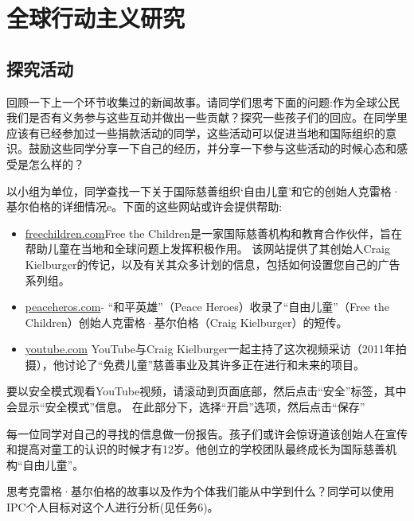\chapter{全球行动主义研究}

\section{探究活动}
    回顾一下上一个环节收集过的新闻故事。请同学们思考下面的问题:作为全球公民我们是否有义务参与这些互动并做出一些贡献？探究一些孩子们的回应。在同学里应该有已经参加过一些捐款活动的同学，这些活动可以促进当地和国际组织的意识。鼓励这些同学分享一下自己的经历，并分享一下参与这些活动的时候心态和感受是怎么样的？\par
    以小组为单位，同学查找一下关于国际慈善组织‘自由儿童’和它的创始人克雷格·基尔伯格的详细情况e。下面的这些网站或许会提供帮助:\par
    \begin{itemize}
      \item \href{http://www.freethechildren.com/about-us/our-story/}{freechildren.com}Free the Children是一家国际慈善机构和教育合作伙伴，旨在帮助儿童在当地和全球问题上发挥积极作用。 该网站提供了其创始人Craig Kielburger的传记，以及有关其众多计划的信息，包括如何设置您自己的广告系列组。
      \item \href{http://www.peaceheroes.com/CraigKielburger/craigkielburgerbio.htm}{peaceheros.com}- “和平英雄”（Peace Heroes）收录了“自由儿童”（Free the Children）创始人克雷格·基尔伯格（Craig Kielburger）的短传。
      \item \href{http://www.youtube.com/watch?v=MDV-zMd3BTM}{youtube.com} YouTube与Craig Kielburger一起主持了这次视频采访（2011年拍摄），他讨论了“免费儿童”慈善事业及其许多正在进行和未来的项目。
    \end{itemize}  

    \begin{note}
      要以安全模式观看YouTube视频，请滚动到页面底部，然后点击“安全”标签，其中会显示“安全模式”信息。 在此部分下，选择“开启”选项，然后点击“保存”
    \end{note}  
    每一位同学对自己的寻找的信息做一份报告。孩子们或许会惊讶道该创始人在宣传和提高对童工的认识的时候才有12岁。他创立的学校团队最终成长为国际慈善机构“自由儿童”。\par
    思考克雷格·基尔伯格的故事以及作为个体我们能从中学到什么？同学可以使用IPC个人目标对这个人进行分析(见任务6)。\par

